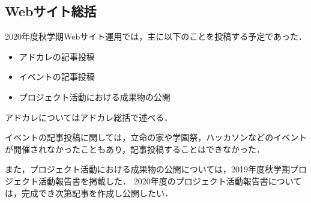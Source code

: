 \subsection*{Webサイト総括}



2020年度秋学期Webサイト運用では，主に以下のことを投稿する予定であった．

\begin{itemize}
  \item アドカレの記事投稿
  \item イベントの記事投稿
  \item プロジェクト活動における成果物の公開
\end{itemize}

アドカレについてはアドカレ総括で述べる．

イベントの記事投稿に関しては，立命の家や学園祭，ハッカソンなどのイベントが開催されなかったこともあり，記事投稿することはできなかった．

また，プロジェクト活動における成果物の公開については，2019年度秋学期プロジェクト活動報告書を掲載した．
2020年度のプロジェクト活動報告書については，完成でき次第記事を作成し公開したい．

